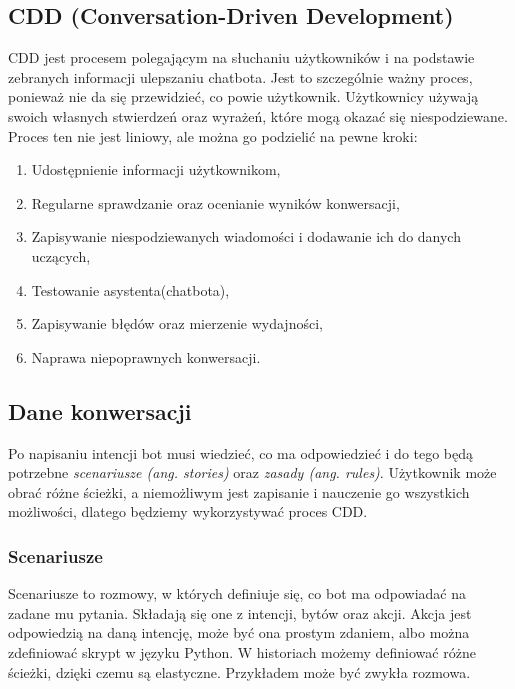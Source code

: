 \documentclass{article}
\begin{document}
\subsection{CDD (Conversation-Driven Development)}
CDD jest procesem polegającym na słuchaniu użytkowników i na podstawie
zebranych informacji ulepszaniu chatbota. Jest to szczególnie ważny proces,
ponieważ nie da się przewidzieć, co powie użytkownik. Użytkownicy używają
swoich własnych stwierdzeń oraz wyrażeń, które mogą okazać się niespodziewane.
Proces ten nie jest liniowy, ale można go podzielić na pewne kroki:
\begin{enumerate}
    \item[\textcolor{violet}{\textbullet}] Udostępnienie informacji użytkownikom,
    \item[\textcolor{violet}{\textbullet}] Regularne sprawdzanie oraz ocenianie wyników konwersacji,
    \item[\textcolor{violet}{\textbullet}] Zapisywanie niespodziewanych wiadomości i dodawanie ich do danych
    uczących,
    \item[\textcolor{violet}{\textbullet}] Testowanie asystenta(chatbota),
    \item[\textcolor{violet}{\textbullet}] Zapisywanie błędów oraz mierzenie wydajności,
    \item[\textcolor{violet}{\textbullet}] Naprawa niepoprawnych konwersacji.
\end{enumerate}

\subsection{Dane konwersacji}
Po napisaniu intencji bot musi wiedzieć, co ma odpowiedzieć i do tego będą
potrzebne \emph{scenariusze (ang. stories)} oraz \emph{zasady (ang. rules)}.
Użytkownik może obrać różne ścieżki, a niemożliwym jest zapisanie i
nauczenie go wszystkich możliwości, dlatego będziemy wykorzystywać proces CDD.

\subsubsection{Scenariusze}
Scenariusze to rozmowy, w których definiuje się, co bot ma odpowiadać na zadane
mu pytania. Składają się one z intencji, bytów oraz akcji. Akcja jest
odpowiedzią na daną intencję, może być ona prostym zdaniem, albo można
zdefiniować skrypt w języku Python. W historiach możemy definiować różne
ścieżki, dzięki czemu są elastyczne. Przykładem może być zwykła rozmowa.
\end{document}

